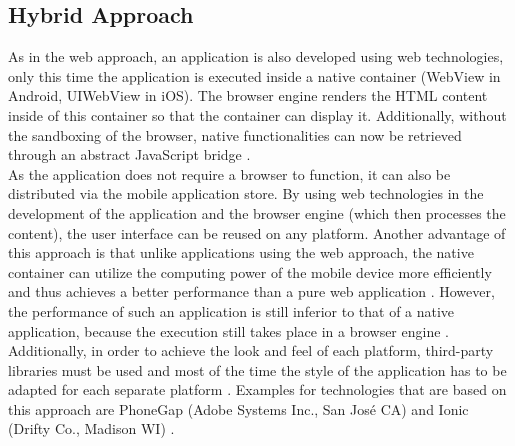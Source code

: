 \documentclass[Bachelor,BIF,english]{twbook}
\begin{document}
\subsection{Hybrid Approach}
As in the web approach, an application is also developed using web technologies, only this time the application is executed inside a native container (WebView in Android, UIWebView in iOS). The browser engine renders the HTML content inside of this container so that the container can display it. Additionally, without the sandboxing of the browser, native functionalities can now be retrieved through an abstract JavaScript bridge \cite[p.~626]{6420693} \cite[p.~2]{7479278}. 
\\[\baselineskip]
As the application does not require a browser to function, it can also be distributed via the mobile application store. By using web technologies in the development of the application and the browser engine (which then processes the content), the user interface can be reused on any platform. Another advantage of this approach is that unlike applications using the web approach, the native container can utilize the computing power of the mobile device more efficiently and thus achieves a better performance than a pure web application \cite[p.~626]{6420693}. However, the performance of such an application is still inferior to that of a native application, because the execution still takes place in a browser engine \cite[p.~2]{7479278}. Additionally, in order to achieve the look and feel of each platform, third-party libraries must be used and most of the time the style of the application has to be adapted for each separate platform \cite[p.~627]{6420693}. Examples for technologies that are based on this approach are PhoneGap (Adobe Systems Inc., San José CA) and Ionic (Drifty Co., Madison WI) \cite[p.~2]{7934674}.
\end{document}
